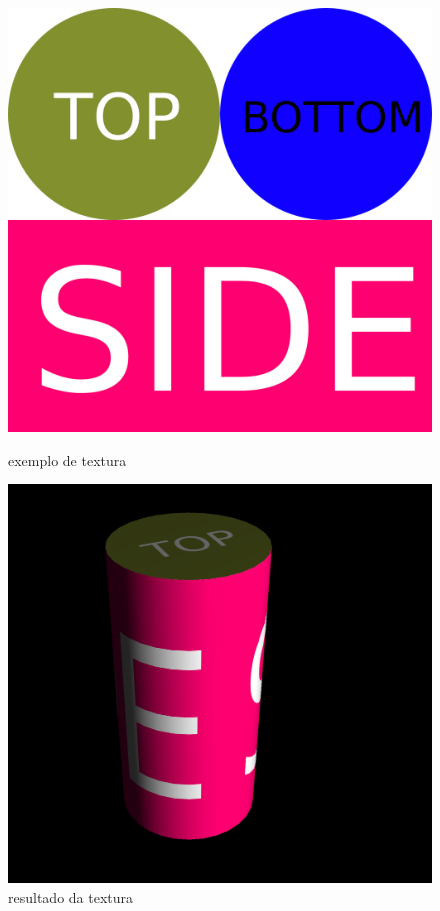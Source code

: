 \documentclass[a4paper]{report}
\begin{document}
\begin{figure}[H]
    \centering
    \begin{minipage}{0.40\textwidth}
        \centering
        \includegraphics[width=\textwidth]{images/cylinder_texture.jpg}
        \caption{exemplo de textura}
    \end{minipage}\hfill
    \begin{minipage}{0.59\textwidth}
        \centering
        \includegraphics[width=\textwidth]{images/cylinder_rendered.png}
        \caption{resultado da textura}
    \end{minipage}\hfill
\end{figure}
\end{document}
